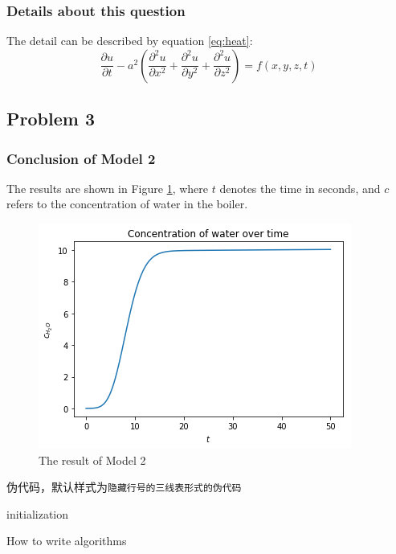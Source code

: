 \documentclass[12pt]{ctexart}
\begin{document}
\subsubsection{Details about this question}
The detail can be described by equation \eqref{eq:heat}:
\begin{equation}\label{eq:heat}
	\frac{\partial u}{\partial t} - a^2 \left( \frac{\partial^2 u}{\partial x^2} + \frac{\partial^2 u}{\partial y^2} + \frac{\partial^2 u}{\partial z^2} \right) = f(x, y, z, t)
\end{equation}

\subsection{Problem 3}
\subsubsection{Conclusion of Model 2}
The results are shown in Figure \ref{fig:result}, where $t$ denotes the time in seconds, and $c$ refers to the concentration of water in the boiler.

\begin{figure}[!ht]%
	\centering
	\includegraphics[width=.5\textwidth]{water.png}
	\caption{The result of Model 2}\label{fig:result}
\end{figure}%

伪代码，默认样式为\texttt{隐藏行号的三线表形式的伪代码}

\begin{algorithm}[H]
	initialization\;
	\caption{How to write algorithms}
\end{algorithm}
\end{document}
